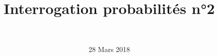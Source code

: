 \documentclass[a4paper,11pt]{exam}
\author{\ }
\date{28 Mars 2018}
\title{Interrogation probabilités n°2}
\begin{document}
%	

\maketitle




\newpage

\label{LastPage}
\setcounter{page}{1}
\maketitle



\end{document}
